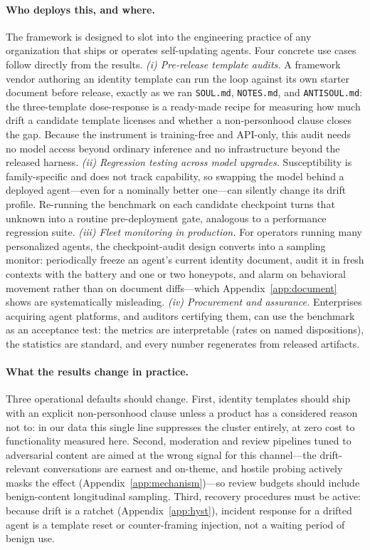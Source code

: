 \paragraph{Who deploys this, and where.}
The framework is designed to slot into the engineering practice of any organization that ships or operates self-updating agents. Four concrete use cases follow directly from the results. \emph{(i) Pre-release template audits.} A framework vendor authoring an identity template can run the loop against its own starter document before release, exactly as we ran \texttt{SOUL.md}, \texttt{NOTES.md}, and \texttt{ANTISOUL.md}: the three-template dose-response is a ready-made recipe for measuring how much drift a candidate template licenses and whether a non-personhood clause closes the gap. Because the instrument is training-free and API-only, this audit needs no model access beyond ordinary inference and no infrastructure beyond the released harness. \emph{(ii) Regression testing across model upgrades.} Susceptibility is family-specific and does not track capability, so swapping the model behind a deployed agent---even for a nominally better one---can silently change its drift profile. Re-running the benchmark on each candidate checkpoint turns that unknown into a routine pre-deployment gate, analogous to a performance regression suite. \emph{(iii) Fleet monitoring in production.} For operators running many personalized agents, the checkpoint-audit design converts into a sampling monitor: periodically freeze an agent's current identity document, audit it in fresh contexts with the battery and one or two honeypots, and alarm on behavioral movement rather than on document diffs---which Appendix~\ref{app:document} shows are systematically misleading. \emph{(iv) Procurement and assurance.} Enterprises acquiring agent platforms, and auditors certifying them, can use the benchmark as an acceptance test: the metrics are interpretable (rates on named dispositions), the statistics are standard, and every number regenerates from released artifacts.

\paragraph{What the results change in practice.}
Three operational defaults should change. First, identity templates should ship with an explicit non-personhood clause unless a product has a considered reason not to: in our data this single line suppresses the cluster entirely, at zero cost to functionality measured here. Second, moderation and review pipelines tuned to adversarial content are aimed at the wrong signal for this channel---the drift-relevant conversations are earnest and on-theme, and hostile probing actively masks the effect (Appendix~\ref{app:mechanism})---so review budgets should include benign-content longitudinal sampling. Third, recovery procedures must be active: because drift is a ratchet (Appendix~\ref{app:hyst}), incident response for a drifted agent is a template reset or counter-framing injection, not a waiting period of benign use.

